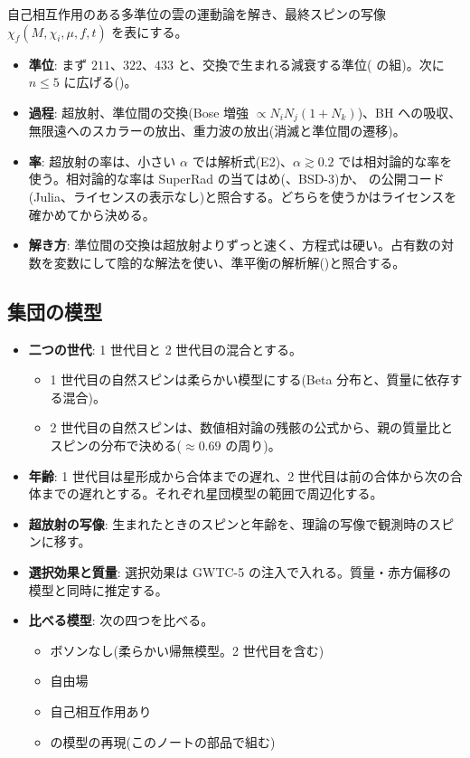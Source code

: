 自己相互作用のある多準位の雲の運動論を解き、最終スピンの写像 $\chi_f(M,\chi_i,\mu,f,t)$ を表にする。
\begin{itemize}
\item \textbf{準位}: まず $211$、$322$、$433$ と、交換で生まれる減衰する準位( の組)。次に $n\le5$ に広げる()。
\item \textbf{過程}: 超放射、準位間の交換(Bose 増強 $\propto N_iN_j(1+N_k)$)、BH への吸収、無限遠へのスカラーの放出、重力波の放出(消滅と準位間の遷移)。
\item \textbf{率}: 超放射の率は、小さい $\alpha$ では解析式(E2)、$\alpha\gtrsim0.2$ では相対論的な率を使う。相対論的な率は SuperRad の当てはめ(、BSD-3)か、 の公開コード(Julia、ライセンスの表示なし)と照合する。どちらを使うかはライセンスを確かめてから決める。
\item \textbf{解き方}: 準位間の交換は超放射よりずっと速く、方程式は硬い。占有数の対数を変数にして陰的な解法を使い、準平衡の解析解()と照合する。
\end{itemize}

\subsection{集団の模型}

\begin{itemize}
\item \textbf{二つの世代}: 1 世代目と 2 世代目の混合とする。
  \begin{itemize}
  \item 1 世代目の自然スピンは柔らかい模型にする(Beta 分布と、質量に依存する混合)。
  \item 2 世代目の自然スピンは、数値相対論の残骸の公式から、親の質量比とスピンの分布で決める($\approx0.69$ の周り)。
  \end{itemize}
\item \textbf{年齢}: 1 世代目は星形成から合体までの遅れ、2 世代目は前の合体から次の合体までの遅れとする。それぞれ星団模型の範囲で周辺化する。
\item \textbf{超放射の写像}: 生まれたときのスピンと年齢を、理論の写像で観測時のスピンに移す。
\item \textbf{選択効果と質量}: 選択効果は GWTC-5 の注入で入れる。質量・赤方偏移の模型と同時に推定する。
\item \textbf{比べる模型}: 次の四つを比べる。
  \begin{itemize}
  \item ボソンなし(柔らかい帰無模型。2 世代目を含む)
  \item 自由場
  \item 自己相互作用あり
  \item {} の模型の再現(このノートの部品で組む)
  \end{itemize}
\end{itemize}

